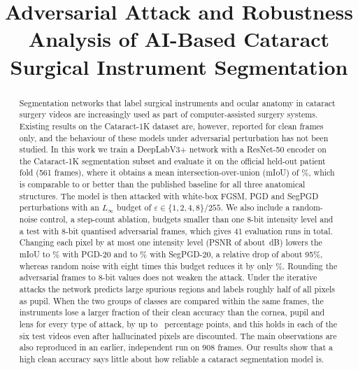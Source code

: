 \documentclass[conference]{IEEEtran}
\newcommand{\eps}{\varepsilon}
\begin{document}
\title{Adversarial Attack and Robustness Analysis of AI-Based Cataract Surgical Instrument Segmentation}

\author{
}

\maketitle

\begin{abstract}
Segmentation networks that label surgical instruments and ocular anatomy in cataract surgery videos are increasingly used as part of computer-assisted surgery systems. Existing results on the Cataract-1K dataset are, however, reported for clean frames only, and the behaviour of these models under adversarial perturbation has not been studied. In this work we train a DeepLabV3+ network with a ResNet-50 encoder on the Cataract-1K segmentation subset and evaluate it on the official held-out patient fold (561 frames), where it obtains a mean intersection-over-union (mIoU) of \nCleanMIoU\%, which is comparable to or better than the published baseline for all three anatomical structures. The model is then attacked with white-box FGSM, PGD and SegPGD perturbations with an $L_\infty$ budget of $\eps\in\{1,2,4,8\}/255$. We also include a random-noise control, a step-count ablation, budgets smaller than one 8-bit intensity level and a test with 8-bit quantised adversarial frames, which gives 41 evaluation runs in total. Changing each pixel by at most one intensity level (PSNR of about \nPSNRPGDOne\,dB) lowers the mIoU to \nPGDOne\% with PGD-20 and to \nSegOne\% with SegPGD-20, a relative drop of about 95\%, whereas random noise with eight times this budget reduces it by only \nNoiseEightFall\%. Rounding the adversarial frames to 8-bit values does not weaken the attack. Under the iterative attacks the network predicts large spurious regions and labels roughly half of all pixels as pupil. When the two groups of classes are compared within the same frames, the instruments lose a larger fraction of their clean accuracy than the cornea, pupil and lens for every type of attack, by up to \nGapPGDQ\ percentage points, and this holds in each of the six test videos even after hallucinated pixels are discounted. The main observations are also reproduced in an earlier, independent run on 908 frames. Our results show that a high clean accuracy says little about how reliable a cataract segmentation model is.
\end{abstract}
\end{document}

